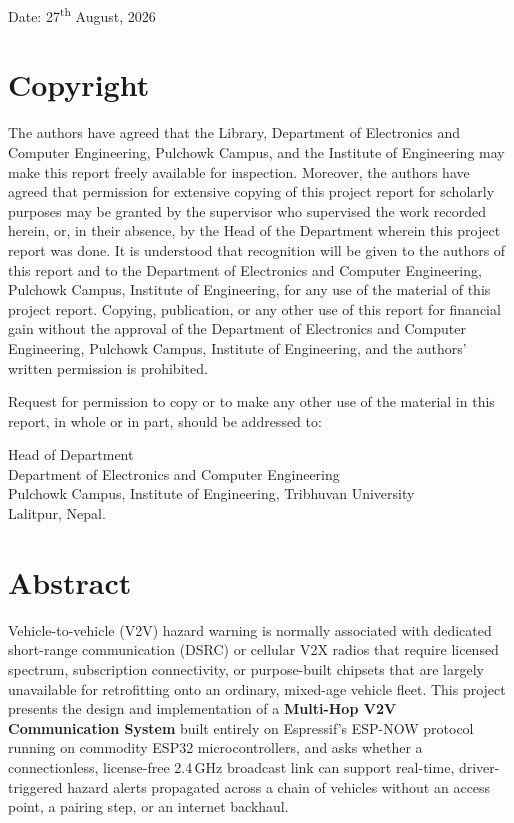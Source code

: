 \documentclass[12pt,a4paper]{report}
\newcommand{\frontchapter}[1]{%
  \chapter*{#1}
  \addcontentsline{toc}{chapter}{#1}
}
\begin{document}
\vspace{1.6cm}
\noindent Date: 27\textsuperscript{th} August, 2026

\frontchapter{Copyright}

The authors have agreed that the Library, Department of Electronics and Computer Engineering, Pulchowk Campus, and the Institute of Engineering may make this report freely available for inspection. Moreover, the authors have agreed that permission for extensive copying of this project report for scholarly purposes may be granted by the supervisor who supervised the work recorded herein, or, in their absence, by the Head of the Department wherein this project report was done. It is understood that recognition will be given to the authors of this report and to the Department of Electronics and Computer Engineering, Pulchowk Campus, Institute of Engineering, for any use of the material of this project report. Copying, publication, or any other use of this report for financial gain without the approval of the Department of Electronics and Computer Engineering, Pulchowk Campus, Institute of Engineering, and the authors' written permission is prohibited.

Request for permission to copy or to make any other use of the material in this report, in whole or in part, should be addressed to:

\vspace{0.6cm}
\noindent
Head of Department\\
Department of Electronics and Computer Engineering\\
Pulchowk Campus, Institute of Engineering, Tribhuvan University\\
Lalitpur, Nepal.

\frontchapter{Abstract}

Vehicle-to-vehicle (V2V) hazard warning is normally associated with dedicated short-range communication (DSRC) or cellular V2X radios that require licensed spectrum, subscription connectivity, or purpose-built chipsets that are largely unavailable for retrofitting onto an ordinary, mixed-age vehicle fleet. This project presents the design and implementation of a \textbf{Multi-Hop V2V Communication System} built entirely on Espressif's ESP-NOW protocol running on commodity ESP32 microcontrollers, and asks whether a connectionless, license-free 2.4\,GHz broadcast link can support real-time, driver-triggered hazard alerts propagated across a chain of vehicles without an access point, a pairing step, or an internet backhaul.
\end{document}
